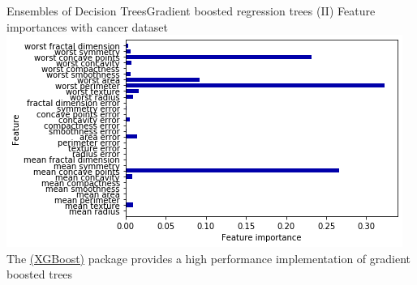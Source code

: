 \documentclass[10pt,compress]{beamer} %
\begin{document}
\begin{frame}{Ensembles of Decision Trees}{Gradient boosted regression trees (II)}
    Feature importances with cancer dataset\\
    \bigskip
    \centering \includegraphics[width=0.8\linewidth]{figs/gradientboosting.png}\\
    \medskip
    \flushleft The \href{https://xgboost.ai/}{(XGBoost)} package provides a high performance implementation of gradient boosted trees
\end{frame}
\end{document}
